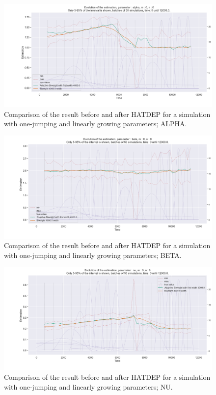 \begin{figure}
\centering
\includegraphics[width = 0.90 \textwidth]{../imag/chap3/3/J.png}
\caption{Comparison of the result before and after HATDEP for a simulation with one-jumping and linearly growing parameters; ALPHA.}
\label{fig:first_estimate_3_alpha}
\end{figure}

\begin{figure}
\centering
\includegraphics[width = 0.90 \textwidth]{../imag/chap3/3/K.png}
\caption{Comparison of the result before and after HATDEP for a simulation with one-jumping and linearly growing parameters; BETA.}
\label{fig:first_estimate_3_beta}
\end{figure}

\begin{figure}
\centering
\includegraphics[width = 0.90 \textwidth]{../imag/chap3/3/L.png}
\caption{Comparison of the result before and after HATDEP for a simulation with one-jumping and linearly growing parameters; NU.}
\label{fig:first_estimate_3_nu}
\end{figure}















